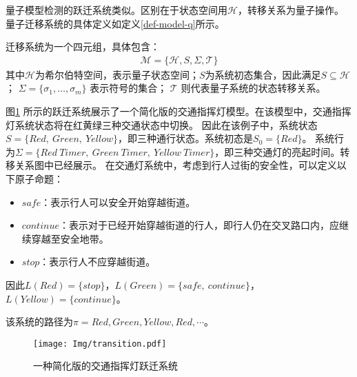 量子模型检测的跃迁系统类似。区别在于状态空间用\(\mathcal{H}\)，转移关系为量子操作。量子迁移系统的具体定义如定义\ref{def-model-q}所示。
\begin{definition}\citep{2021}
    \label{def-model-q}
    迁移系统为一个四元组，具体包含：
    \begin{align}
        \mathcal{M}=\{\mathcal{H},S,\Sigma,\mathcal{T}\}
    \end{align}
    其中\(\mathcal{H}\)为希尔伯特空间，表示量子状态空间；\(S\)为系统初态集合，因此满足\(S\subseteq \mathcal{H}\)； $\Sigma=\{\sigma_1,\ldots,\sigma_m\}$ 表示符号的集合； $\mathcal{T}$ 则代表量子系统的状态转移关系。
\end{definition}
\begin{example}
    \label{ex-transition}
    图\ref{fig:transition-system} 所示的跃迁系统展示了一个简化版的交通指挥灯模型。在该模型中，交通指挥灯系统状态将在红黄绿三种交通状态中切换。
    因此在该例子中，系统状态\(S=\{Red,\ Green,\ Yellow\}\)，即三种通行状态。系统初态是\(S_0 = \{Red\}\)。
    系统行为\(\Sigma=\{Red\ Timer,\ Green\ Timer,\ Yellow\  Timer\}\)，即三种交通灯的亮起时间。转移关系图中已经展示。
    在交通灯系统中，考虑到行人过街的安全性，可以定义以下原子命题：
\begin{itemize}
    \item \(safe\)：表示行人可以安全开始穿越街道。
    \item \(continue\)：表示对于已经开始穿越街道的行人，即行人仍在交叉路口内，应继续穿越至安全地带。
    \item \(stop\)：表示行人不应穿越街道。
\end{itemize}
因此\(L\left(Red  \right)=\{stop\}\)，\(L\left(Green \right)=\{safe,\ continue\}\)，\(L\left(Yellow  \right)=\{continue\}\)。

该系统的路径为\(\pi = Red, Green , Yellow , Red , \cdots \)。
    \begin{figure}[!htbp]
        \centering
        \texttt{[image: Img/transition.pdf]}
        \caption{一种简化版的交通指挥灯跃迁系统}
        \label{fig:transition-system}
    \end{figure}
\end{example}

